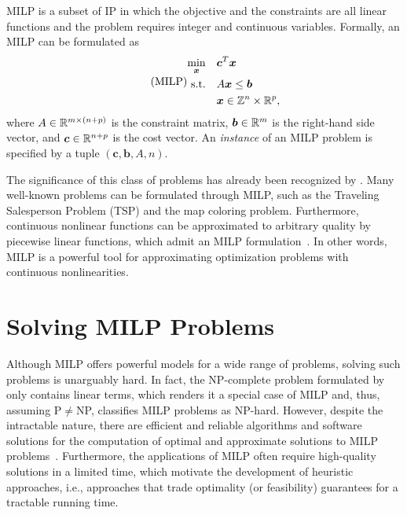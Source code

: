 MILP is a subset of IP in which the objective and the constraints are all linear functions and the problem requires integer and continuous variables.
Formally, an MILP can be formulated as 
\begin{equation}\label{eq:general-milp}\tag{MILP}
\begin{split}
    \min_{\bm{x}} \quad & \bm{c}^{T}\bm{x} \\
    \textrm{s.t.} \quad & A\bm{x} \le \bm{b} \\
	  & \bm{x} \in \mathbb{Z}^{n}\times \mathbb{R}^{p}
,\end{split}
\end{equation}
where $A\in \mathbb{R}^{m\times (n+p)}$ is the constraint matrix, $\bm{b}\in \mathbb{R}^{m}$ is the right-hand side vector, and $\bm{c}\in \mathbb{R}^{n+p}$ is the cost vector.
An \emph{instance} of an MILP problem is specified by a tuple  $\left( \bm{c},\bm{b},A,n \right)$.

The significance of this class of problems has already been recognized by .
Many well-known problems can be formulated through MILP, such as the Traveling Salesperson Problem (TSP) and the map coloring problem.
Furthermore, continuous nonlinear functions can be approximated to arbitrary quality by piecewise linear functions, which admit an MILP formulation~\cite{camponogaraModelsAlgorithmsOptimal2015}.
In other words, MILP is a powerful tool for approximating optimization problems with continuous nonlinearities.

\section{Solving MILP Problems}

Although MILP offers powerful models for a wide range of problems, solving such problems is unarguably hard.
In fact, the NP-complete problem formulated by  only contains linear terms, which renders it a special case of MILP and, thus, assuming P$\neq$NP, classifies MILP problems as NP-hard.
However, despite the intractable nature, there are efficient and reliable algorithms and software solutions for the computation of optimal and approximate solutions to MILP problems~\cite{bengioMachineLearningCombinatorial2021}.
Furthermore, the applications of MILP often require high-quality solutions in a limited time, which motivate the development of heuristic approaches, i.e., approaches that trade optimality (or feasibility) guarantees for a tractable running time.

